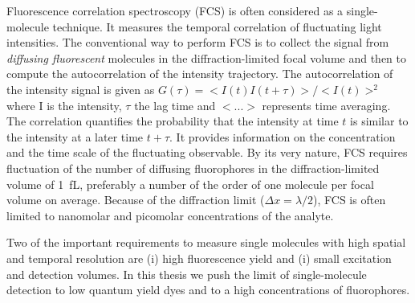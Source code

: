 Fluorescence correlation spectroscopy (FCS) is often considered as a single-molecule technique. It measures the temporal correlation of fluctuating light intensities.\cite{magde1972thermodynamic,elson1974fluorescence,krichevsky2002fluorescence}
The conventional way to perform FCS is to collect the signal from \textit{diffusing fluorescent} molecules in the diffraction-limited focal volume and then to compute the autocorrelation of the intensity trajectory.
The autocorrelation of the intensity signal is given as $G(\tau)=<I(t)I(t+\tau)>/<I(t)>^2$ where I is the intensity, $\tau$ the lag time and $<...>$ represents time averaging.
The correlation quantifies the probability that the intensity at time $t$ is similar to the intensity at a later time $t+\tau$.
It provides information on the concentration and the time scale of the fluctuating observable.
By its very nature, FCS requires fluctuation of the number of diffusing fluorophores in the diffraction-limited volume of \SI{1}{fL}, preferably a number of the order of one molecule per focal volume on average.
Because of the diffraction limit ($\Delta{x}={\lambda}/2$), FCS is often limited to nanomolar and picomolar concentrations of the analyte. 

Two of the important requirements to measure single molecules with high spatial and temporal resolution are (i) high fluorescence yield and (i) small excitation and detection volumes.
In this thesis we push the limit of single-molecule detection to low quantum yield dyes and to a high concentrations of fluorophores.

